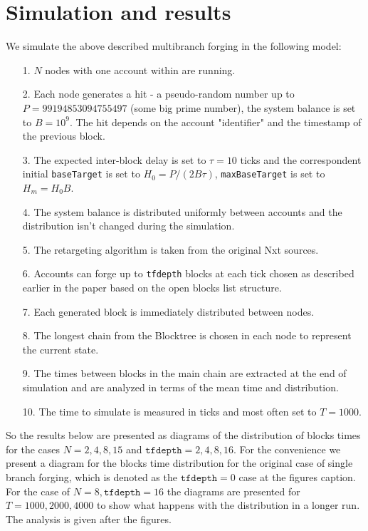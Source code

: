 \documentclass[12pt]{article}
\begin{document}
\section{Simulation and results}
We simulate the above described multibranch forging in the following model:
\begin{itemize}
\item[1.]{$N$ nodes with one account within are running.}
\item[2.]{Each node generates a hit \-- a pseudo-random number up to $P=99194853094755497$ (some big prime number), the system balance 
is set to $B=10^9$. The hit depends on the account "identifier" and the timestamp of the previous block.}
\item[3.]{The expected inter-block delay is set to $\tau=10$ ticks and the correspondent initial \texttt{baseTarget} is set to $H_0=P/(2B\tau)$, 
\texttt{maxBaseTarget} is set to $H_m=H_0B$.}
\item[4.]{The system balance is distributed uniformly between accounts and the distribution isn't changed during the simulation.}
\item[5.]{The retargeting algorithm is taken from the original Nxt sources.}
\item[6.]{Accounts can forge up to \texttt{tfdepth} blocks at each tick chosen as described earlier in the paper based on the open blocks list structure.}
\item[7.]{Each generated block is immediately distributed between nodes.}
\item[8.]{The longest chain from the Blocktree is chosen in each node to represent the current state.}
\item[9.]{The times between blocks in the main chain are extracted at the end of simulation and are analyzed in terms of the mean time and distribution.}
\item[10.]{The time to simulate is measured in ticks and most often set to $T=1000$.}
\end{itemize}

So the results below are presented as diagrams of the distribution of blocks times for the cases $N=2,4,8,15$ and $\texttt{tfdepth}=2,4,8,16$.
For the convenience we present a diagram for the blocks time distribution for the original case of single branch forging, which is denoted as 
the $\texttt{tfdepth}=0$ case at the figures caption. For the case of $N=8, \texttt{tfdepth}=16$ the diagrams are presented for $T=1000,2000,4000$
to show what happens with the distribution in a longer run.
The analysis is given after the figures.
\end{document}
